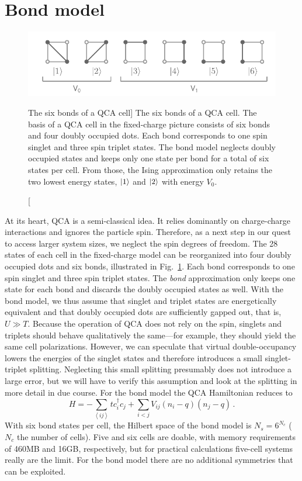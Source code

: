 \section{Bond model}

%
\begin{figure}
  \center
  \includegraphics{bond}
  \caption
  [The six bonds of a QCA cell]
  {
  The six bonds of a QCA cell. The basis of a QCA cell in the fixed-charge
  picture consists of six bonds and four doubly occupied dots. Each bond
  corresponds to one spin singlet and three spin triplet states. The bond model
  neglects doubly occupied states and keeps only one state per bond for a total
  of six states per cell. From those, the Ising approximation only retains
  the two lowest energy states, $\left|1\right>$ and $\left|2\right>$ with energy $V_0$.
  }
  \label{fig:bond}
\end{figure}
%
At its heart, QCA is a semi-classical idea. It relies dominantly on
charge-charge interactions and ignores the particle spin. Therefore, as a next
step in our quest to access larger system sizes, we neglect the spin degrees of
freedom. The 28 states of each cell in the fixed-charge model can be reorganized
into four doubly occupied dots and six bonds, illustrated in
Fig.~\ref{fig:bond}. Each bond corresponds to one spin singlet and three spin
triplet states. The \emph{bond} approximation only keeps one state for each bond
and discards the doubly occupied states as well. With the bond model, we thus
assume that singlet and triplet states are energetically equivalent and that
doubly occupied dots are sufficiently gapped out, that is, $U \gg T$. Because
the operation of QCA does not rely on the spin, singlets and triplets should
behave qualitatively the same---for example, they should yield the same cell
polarizations. However, we can speculate that virtual double-occupancy lowers
the energies of the singlet states and therefore introduces a small
singlet-triplet splitting. Neglecting this small splitting presumably does not
introduce a large error, but we will have to verify this assumption and look at
the splitting in more detail in due course. For the bond model the QCA
Hamiltonian reduces to
%
\begin{equation}
  \label{eq:H_bond}
  H = - \sum_{\left<ij\right>} t c_i^{\dagger} c_j
      + \sum_{i<j} V_{ij} \left( n_i - q \right) \left( n_j - q \right) \, .
\end{equation}
%
With six bond states per cell, the Hilbert space of the bond model is $N_s =
6^{N_c}$ ($N_c$ the number of cells). Five and six cells are doable, with memory
requirements of 460MB and 16GB, respectively, but for practical calculations
five-cell systems really are the limit. For the bond model there are no
additional symmetries that can be exploited.


